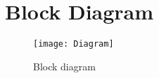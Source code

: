 \section{Block Diagram}



\begin{figure}[H]
    \centerline{\texttt{[image: Diagram]}}
    \vspace{0cm}\caption{Block diagram}
    \label{fig:Block Diagram}
\end{figure}


